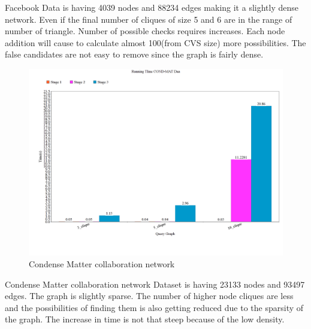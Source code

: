 \hspace{10mm} Facebook Data is having 4039 nodes and 88234 edges making it a slightly dense network. Even if the final number of cliques of size 5 and 6 are in the range of number of triangle. Number of possible checks requires increases. Each node addition will cause to calculate almost 100(from CVS size) more possibilities. The false candidates are not easy to remove since the graph is fairly dense.\\
\begin{figure}[h!]
 \centering
\includegraphics[width=.5\textwidth]{CA.png}
 \caption{Condense Matter collaboration network}
 \label{fig:ca}
\end{figure}
\hspace{10mm}Condense Matter collaboration network Dataset is having 23133 nodes and 93497 edges. The graph is slightly sparse. The number of higher node cliques are less and the possibilities of finding them is also getting reduced due to the sparsity of the graph. The increase in time is not that steep because of the low density.
